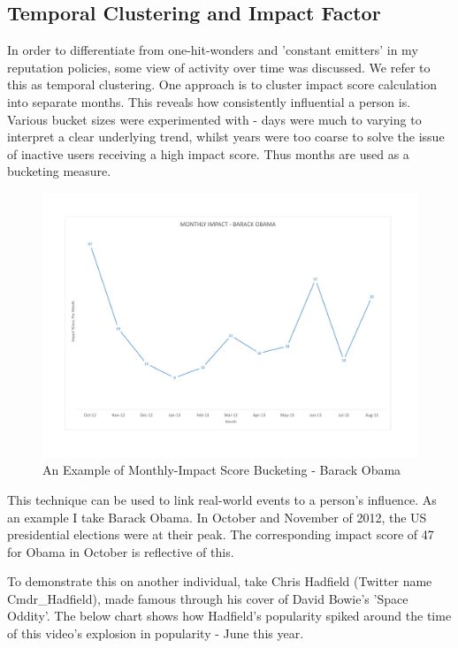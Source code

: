 \subsection{Temporal Clustering and Impact Factor}

In order to differentiate from one-hit-wonders and 'constant emitters' in my reputation policies, some view of activity over time was discussed. We refer to this as temporal clustering. One approach is to cluster impact score calculation into separate months. This reveals how consistently influential a person is. Various bucket sizes were experimented with - days were much to varying to interpret a clear underlying trend, whilst years were too coarse to solve the issue of inactive users receiving a high impact score. Thus months are used as a bucketing measure.

\begin{figure}[h!]
\begin{center}
\centering
\includegraphics[width=500px]{Images/barack_obama_monthly_impact.pdf}
\caption{An Example of Monthly-Impact Score Bucketing - Barack Obama}
\end{center}
\end{figure}

This technique can be used to link real-world events to a person's influence. As an example I take Barack Obama. In October and November of 2012, the US presidential elections were at their peak. The corresponding impact score of 47 for Obama in October is reflective of this. 

To demonstrate this on another individual, take Chris Hadfield (Twitter name Cmdr\_Hadfield), made famous through his cover of David Bowie's 'Space Oddity'. The below chart shows how Hadfield's popularity spiked around the time of this video's explosion in popularity - June this year. 

